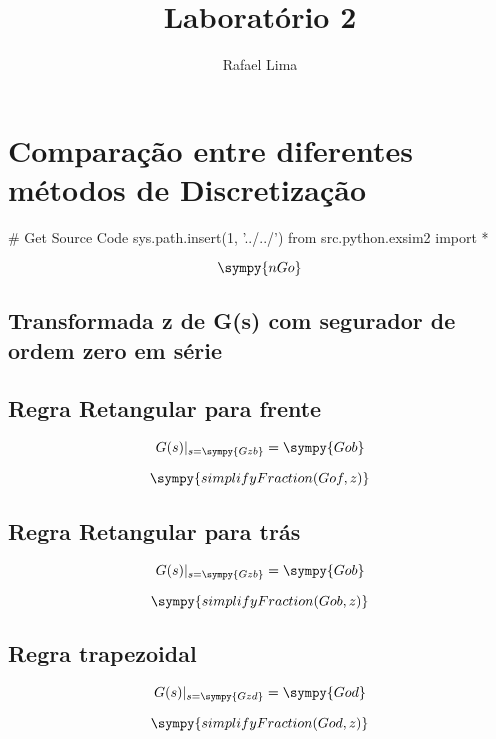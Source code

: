 \documentclass[a4paper,11pt]{article}
\title{Laboratório 2} %
\author{Rafael Lima}
\begin{document}

\section{Comparação entre diferentes métodos de Discretização}

\begin{sympycode}
# Get Source Code
sys.path.insert(1, '../../')
from src.python.exsim2 import *
\end{sympycode}

\begin{equation}
\sympy{nGo}
\end{equation}

\subsection{Transformada z de G(s) com segurador de ordem zero em série}
\subsection{Regra Retangular para frente}

$$G(s)|_{s = \sympy{Gzb}} = \sympy{Gob}$$

\begin{equation}
    \sympy{simplifyFraction(Gof,z)}
\end{equation}

\subsection{Regra Retangular para trás}

$$G(s)|_{s = \sympy{Gzb}} = \sympy{Gob}$$

\begin{equation}
    \sympy{simplifyFraction(Gob,z)}
\end{equation}

\subsection{Regra trapezoidal}

$$G(s)|_{s = \sympy{Gzd}} = \sympy{God}$$

\begin{equation}
    \sympy{simplifyFraction(God,z)}
\end{equation}
\end{document}
